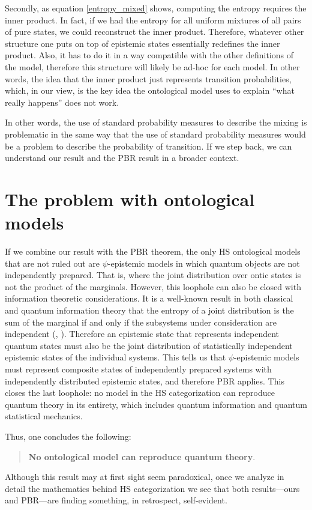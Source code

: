 \documentclass[10pt,twocolumn, nofootinbib]{revtex4-2}
\begin{document}
Secondly, as equation \ref{entropy_mixed} shows, computing the entropy requires the inner product. In fact, if we had the entropy for all uniform mixtures of all pairs of pure states, we could reconstruct the inner product. Therefore, whatever other structure one puts on top of epistemic states essentially redefines the inner product. Also, it has to do it in a way compatible with the other definitions of the model, therefore this structure will likely be ad-hoc for each model. In other words, the idea that the inner product just represents transition probabilities, which, in our view, is the key idea the ontological model uses to explain ``what really happens'' does not work.

In other words, the use of standard probability measures to describe the mixing is problematic in the same way that the use of standard probability measures would be a problem to describe the probability of transition. If we step back, we can understand our result and the PBR result in a broader context.

\section{The problem with ontological models}

If we combine our result with the PBR theorem, the only HS ontological models that are not ruled out are $\psi$-epistemic models in which quantum objects are not independently prepared. That is, where the joint distribution over ontic states is not the product of the marginals. However, this loophole can also be closed with information theoretic considerations. It is a well-known result in both classical and quantum information theory that the entropy of a joint distribution is the sum of the marginal if and only if the subsystems under consideration are independent (\cite{Ash:2010}, \cite{Nielsen:2010}). Therefore an epistemic state that represents independent quantum states must also be the joint distribution of statistically independent epistemic states of the individual systems. This tells us that $\psi$-epistemic models must represent composite states of independently prepared systems with independently distributed epistemic states, and therefore PBR applies. This closes the last loophole: no model in the HS categorization can reproduce quantum theory in its entirety, which includes quantum information and quantum statistical mechanics.

Thus, one concludes the following:
\begin{quote}
	\textbf{No ontological model can reproduce quantum theory}.
\end{quote}
Although this result may at first sight seem paradoxical, once we analyze in detail the mathematics behind HS categorization we see that both results---ours and PBR---are finding something, in retrospect, self-evident.
\end{document}
